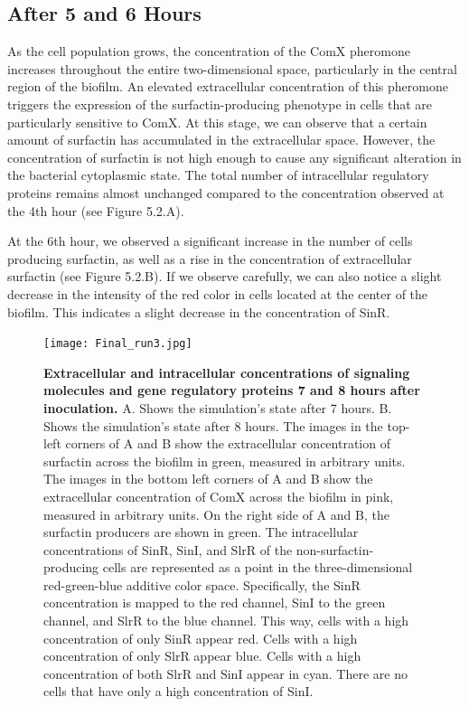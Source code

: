 \subsection{After 5 and 6 Hours}\label{sec:contrib3:theme1}
As the cell population grows, the concentration of the ComX pheromone increases throughout the entire two-dimensional space, particularly in the central region of the biofilm. An elevated extracellular concentration of this pheromone triggers the expression of the surfactin-producing phenotype in cells that are particularly sensitive to ComX. At this stage, we can observe that a certain amount of surfactin has accumulated in the extracellular space. However, the concentration of surfactin is not high enough to cause any significant alteration in the bacterial cytoplasmic state. The total number of intracellular regulatory proteins remains almost unchanged compared to the concentration observed at the 4th hour (see Figure 5.2.A).

At the 6th hour, we observed a significant increase in the number of cells producing surfactin, as well as a rise in the concentration of extracellular surfactin (see Figure 5.2.B). If we observe carefully, we can also notice a slight decrease in the intensity of the red color in cells located at the center of the biofilm. This indicates a slight decrease in the concentration of SinR.


\begin{figure}[h]
    \centering
    \texttt{[image: Final\_run3.jpg]}
        \caption{\footnotesize \textbf{Extracellular and intracellular concentrations of signaling molecules and gene regulatory proteins 7 and 8 hours after inoculation.} A. Shows the simulation's state after 7 hours. B. Shows the simulation's state after 8 hours. The images in the top-left corners of A and B show the extracellular concentration of surfactin across the biofilm in green, measured in arbitrary units. The images in the bottom left corners of A and B show the extracellular concentration of ComX across the biofilm in pink, measured in arbitrary units. On the right side of A and B, the surfactin producers are shown in green. The intracellular concentrations of SinR, SinI, and SlrR of the non-surfactin-producing cells are represented as a point in the three-dimensional red-green-blue additive color space. Specifically, the SinR concentration is mapped to the red channel, SinI to the green channel, and SlrR to the blue channel. This way, cells with a high concentration of only SinR appear red. Cells with a high concentration of only SlrR appear blue. Cells with a high concentration of both SlrR and SinI appear in cyan. There are no cells that have only a high concentration of SinI.}

\end{figure}
